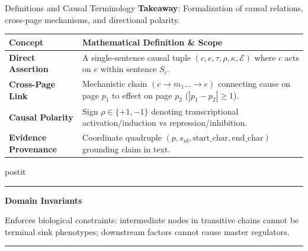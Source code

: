 \documentclass[aspectratio=43,10pt]{beamer}
\newcommand{\card}[4][\linewidth]{%
  \begin{beamercolorbox}[wd=#1,sep=0pt,rounded=false,shadow=false]{postit}%
    {\color{#3}\rule{\linewidth}{1.5pt}}\par
    \colorbox{slatebg}{%
      \begin{minipage}{\dimexpr#1-8pt\relax}%
        \vspace{1.5pt}%
        {\footnotesize\bfseries\color{#3}#2}\vspace{1.5pt}\par%
        {\scriptsize\color{darktext}#4}%
        \vspace{1.5pt}%
      \end{minipage}%
    }%
    \par{\color{bordergray}\rule{\linewidth}{0.6pt}}%
  \end{beamercolorbox}%
}
\begin{document}
\begin{frame}{Definitions and Causal Terminology}
  \textbf{Takeaway}: Formalization of causal relations, cross-page mechanisms, and directional polarity.
  \vspace{0.15cm}
  \begin{center}
    \small
    \begin{tabularx}{\linewidth}{p{2.6cm}>{\raggedright\arraybackslash}X}
      \toprule
      \textbf{\color{navy}Concept} & \textbf{\color{navy}Mathematical Definition \& Scope} \\
      \midrule
      \textbf{Direct Assertion} & A single-sentence causal tuple $(c, e, \tau, \rho, \kappa, \mathcal{E})$ where $c$ acts on $e$ within sentence $S_i$. \\
      \addlinespace[2pt]
      \textbf{Cross-Page Link} & Mechanistic chain $(c \to m_1 \dots \to e)$ connecting cause on page $p_1$ to effect on page $p_2$ ($|p_1 - p_2| \ge 1$). \\
      \addlinespace[2pt]
      \textbf{Causal Polarity} & Sign $\rho \in \{+1, -1\}$ denoting transcriptional activation/induction vs repression/inhibition. \\
      \addlinespace[2pt]
      \textbf{Evidence Provenance} & Coordinate quadruple $(p, s_{id}, \text{start\_char}, \text{end\_char})$ grounding claim in text. \\
      \bottomrule
    \end{tabularx}
  \end{center}
  \vspace{0.15cm}
  \card{Domain Invariants}{navy}{
    Enforces biological constraints: intermediate nodes in transitive chains cannot be terminal sink phenotypes; downstream factors cannot cause master regulators.
  }
\end{frame}
\end{document}
